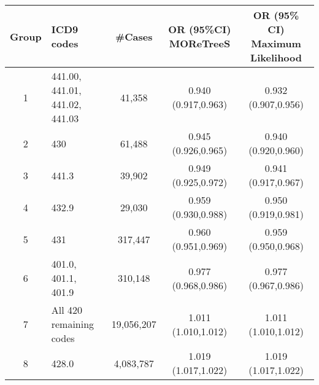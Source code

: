 \begin{tabular}{cp{6cm}ccc}
  \hline
Group & ICD9 codes & \#Cases & OR (95\%CI) MOReTreeS & OR (95\% CI) Maximum Likelihood \\ 
  \hline
1 & 441.00, 441.01, 441.02, 441.03 & 41,358 & 0.940 (0.917,0.963) & 0.932 (0.907,0.956) \\ 
  2 & 430 & 61,488 & 0.945 (0.926,0.965) & 0.940 (0.920,0.960) \\ 
  3 & 441.3 & 39,902 & 0.949 (0.925,0.972) & 0.941 (0.917,0.967) \\ 
  4 & 432.9 & 29,030 & 0.959 (0.930,0.988) & 0.950 (0.919,0.981) \\ 
  5 & 431 & 317,447 & 0.960 (0.951,0.969) & 0.959 (0.950,0.968) \\ 
  6 & 401.0, 401.1, 401.9 & 310,148 & 0.977 (0.968,0.986) & 0.977 (0.967,0.986) \\ 
  7 & All 420 remaining codes & 19,056,207 & 1.011 (1.010,1.012) & 1.011 (1.010,1.012) \\ 
  8 & 428.0 & 4,083,787 & 1.019 (1.017,1.022) & 1.019 (1.017,1.022) \\ 
   \hline
\end{tabular}


